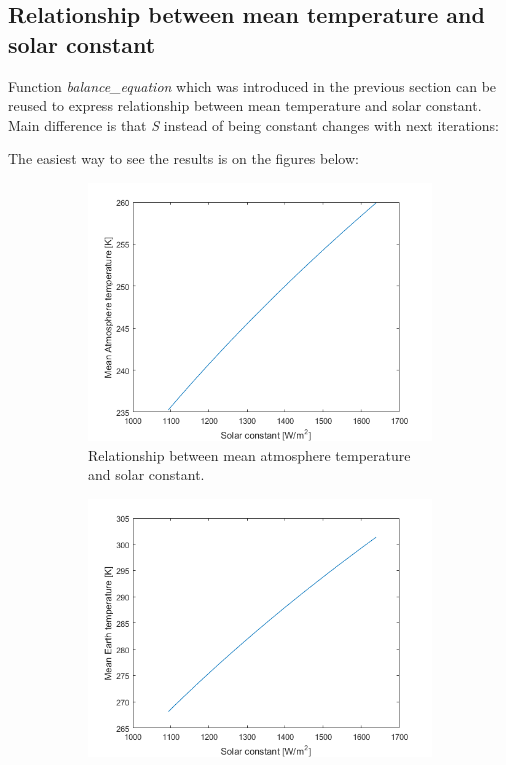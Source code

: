 \documentclass[12pt]{article}
\begin{document}
\subsection{Relationship between mean temperature and solar constant}

Function \textit{balance\_equation} which was introduced in the previous section can be reused to express relationship between mean temperature and solar constant. Main difference is that \textit{S} instead of being constant changes with next iterations:



The easiest way to see the results is on the figures below:

\begin{figure}[H]
	\centering
	\begin{subfigure}[b]{0.8\textwidth}   
		\centering 
		\includegraphics[width=\textwidth]{solar_atm}
		{{\small Relationship between mean atmosphere temperature and solar constant.}}    
	\end{subfigure}
	\begin{subfigure}[b]{0.8\textwidth}   
		\centering 
		\includegraphics[width=\textwidth]{solar_earth}

\end{subfigure}
\end{figure}
\end{document}
